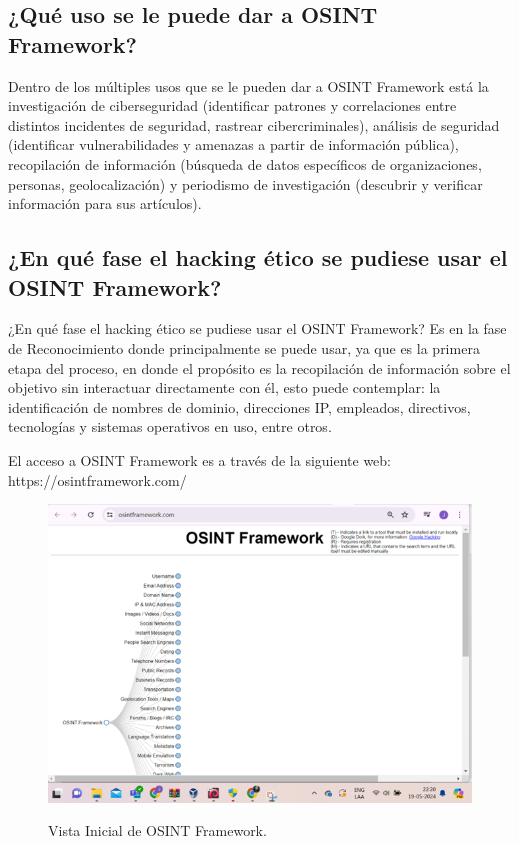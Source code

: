 \documentclass[stu, 11pt, letterpaper, donotrepeattitle, floatsintext, natbib]{apa7}
\begin{document}
\subsection{¿Qué uso se le puede dar a OSINT Framework?}

Dentro de los múltiples usos que se le pueden dar a OSINT Framework está la investigación de ciberseguridad (identificar patrones y correlaciones entre distintos incidentes de seguridad, rastrear cibercriminales), análisis de seguridad (identificar vulnerabilidades y amenazas a partir de información pública), recopilación de información (búsqueda de datos específicos de organizaciones, personas, geolocalización) y periodismo de investigación (descubrir y verificar información para sus artículos).

\subsection{¿En qué fase el hacking ético se pudiese usar el OSINT Framework?}

¿En qué fase el hacking ético se pudiese usar el OSINT Framework?
Es en la fase de Reconocimiento donde principalmente se puede usar, ya que es la primera etapa del proceso, en donde el propósito es la recopilación de información sobre el objetivo sin interactuar directamente con él, esto puede contemplar: la identificación de nombres de dominio, direcciones IP, empleados, directivos, tecnologías y sistemas operativos en uso, entre otros.

El acceso a OSINT Framework es a través de la siguiente web: https://osintframework.com/

\begin{figure}[H]
\centering
\caption{Vista Inicial de OSINT Framework.}
\includegraphics[width=0.75\linewidth]{osi1.png} %
\label{fig:OverallEffect}
\end{figure}
\end{document}

